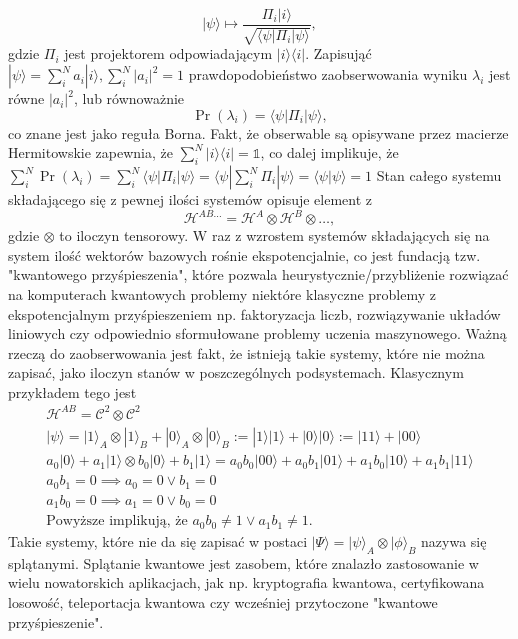 \documentclass[10pt]{article} %
\newcommand{\Hx}[1]{\mathcal{H}^{#1}}
\newcommand{\Pro}[1]{\Pr(#1)}
\newcommand{\Ket}[1]{|#1\rangle}
\newcommand{\Bra}[1]{\langle#1|}
\newcommand{\Braket}[1]{\langle#1\rangle}
\newcommand{\KP}{\Ket{\psi}}
\newcommand{\BP}{\Bra{\psi}}
\begin{document}
\begin{equation}
\label{eq:cond_ev}
\Ket{\psi} \mapsto \frac{\Pi_i\Ket{i}}{\sqrt{\Bra{\psi}\Pi_i \Ket{\psi}}},
\end{equation}
gdzie $\Pi_i$ jest projektorem odpowiadającym $\Ket{i}\Bra{i}$. Zapisująć $\KP = \sum^N_i a_i \Ket{i}, \sum^N_i |a_i|^2=1$ prawdopodobieństwo zaobserwowania wyniku $\lambda_i$ jest równe $|a_i|^2$, lub równoważnie
\begin{equation}
\Pro{\lambda_i} = \BP \Pi_i \KP,
\end{equation}
co znane jest jako reguła Borna. Fakt, że obserwable są opisywane przez macierze Hermitowskie zapewnia, że $\sum^N_i \Ket{i}\Bra{i} = \mathbb{1}$, co dalej implikuje, że $\sum^N_i \Pro{\lambda_i} = \sum^N_i \BP \Pi_i \KP = \BP \sum^N_i \Pi_i \KP = \Braket{\psi | \psi} = 1$
Stan całego systemu składającego się z pewnej ilości systemów opisuje element z
\begin{equation}
\Hx{AB\dots} = \Hx{A} \otimes \Hx{B} \otimes \dots,
\end{equation}
gdzie $\otimes$ to iloczyn tensorowy. W raz z wzrostem systemów składających się na system ilość wektorów bazowych rośnie ekspotencjalnie, co jest fundacją tzw. "kwantowego przyśpieszenia", które pozwala heurystycznie/przybliżenie rozwiązać na komputerach kwantowych problemy niektóre klasyczne problemy z ekspotencjalnym przyśpieszeniem
np. faktoryzacja liczb, rozwiązywanie układów liniowych czy odpowiednio sformułowane problemy uczenia maszynowego.
Ważną rzeczą do zaobserwowania jest fakt, że istnieją takie systemy, które nie można zapisać, jako iloczyn stanów w poszczególnych podsystemach. Klasycznym przykładem tego jest
\begin{gather*}
\Hx{AB} = \mathcal{C}^2 \otimes \mathcal{C}^2 \\
\KP = \Ket{1}_A \otimes \Ket{1}_B + \Ket{0}_A \otimes \Ket{0}_B := \Ket{1}\Ket{1} + \Ket{0}\Ket{0} := \Ket{11} + \Ket{00} \\
a_0\Ket{0} + a_1\Ket{1} \otimes b_0\Ket{0} + b_1\Ket{1} = a_0b_0 \Ket{00} + a_0b_1\Ket{01} + a_1b_0\Ket{10} + a_1b_1\Ket{11} \\
a_0b_1 = 0\implies a_0 = 0\vee b_1 = 0 \\
a_1b_0 = 0\implies a_1 = 0\vee b_0 = 0 \\
\text{Powyższe implikują, że } a_0b_0 \neq 1 \vee a_1b_1 \neq 1.
\end{gather*} Takie systemy, które nie da się zapisać w postaci $\Ket{\Psi} = \Ket{\psi}_A \otimes \Ket{\phi}_B$ nazywa się splątanymi. Splątanie kwantowe jest zasobem, które znalazło zastosowanie w wielu nowatorskich aplikacjach, jak np. kryptografia kwantowa, certyfikowana losowość, teleportacja kwantowa czy wcześniej przytoczone "kwantowe przyśpieszenie".
\end{document}
